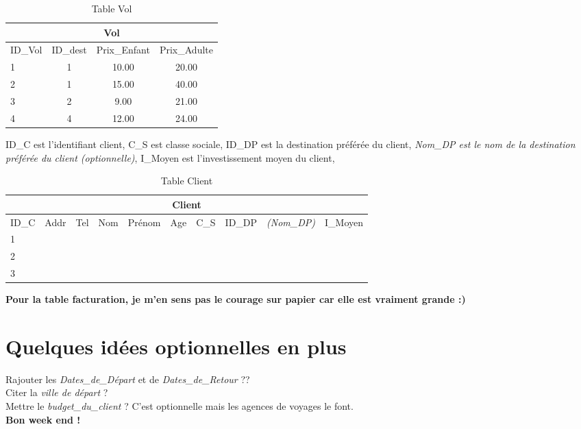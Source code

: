 \documentclass[10pt]{article}
\begin{document}
\begin{table}[h]
\begin{center}
\begin{tabular}{|l|c|c|c|}
\hline
\multicolumn{4}{|c|}{Vol}\\
\hline
ID\_Vol& ID\_dest & Prix\_Enfant& Prix\_Adulte\\
\hline
1 & 1& 10.00 & 20.00\\
\hline
2 & 1& 15.00& 40.00\\
\hline
3 & 2& 9.00& 21.00\\
\hline
4 & 4& 12.00& 24.00\\
\hline
\end{tabular}
\end{center}
\caption{Table Vol}
\end{table}


\begin{table}[h]
ID\_C est l'identifiant client,
C\_S est classe sociale,
ID\_DP est la destination préférée du client,
\textit{Nom\_DP est le nom de la destination préférée du client (optionnelle)},
I\_Moyen est l'investissement moyen du client,
\bigskip

\begin{tabular}{|l|c|c|c|c|c|c|c|c|c|}
\hline
\multicolumn{10}{|c|}{Client}\\
\hline
ID\_C& Addr& Tel & Nom & Prénom & Age & C\_S & ID\_DP &\textit{(Nom\_DP)}&I\_Moyen\\
\hline
1 & & &&  &  & &&&\\
\hline
2 & & &&  &  & &&&\\
\hline
3 & & &&  &  & &&&\\
\hline
\end{tabular}
\caption{Table Client}
\end{table}


\textbf{Pour la table facturation, je m'en sens pas le courage sur papier car elle est vraiment grande :) }

\section{Quelques idées optionnelles en plus}
Rajouter les \textit{Dates\_de\_Départ} et de \textit{Dates\_de\_Retour} ?? \\
Citer la \textit{ville de départ} ? \\
Mettre le \textit{budget\_du\_client} ? C'est optionnelle mais les agences de voyages le font. \\


\textbf{Bon week end !}
\end{document}
